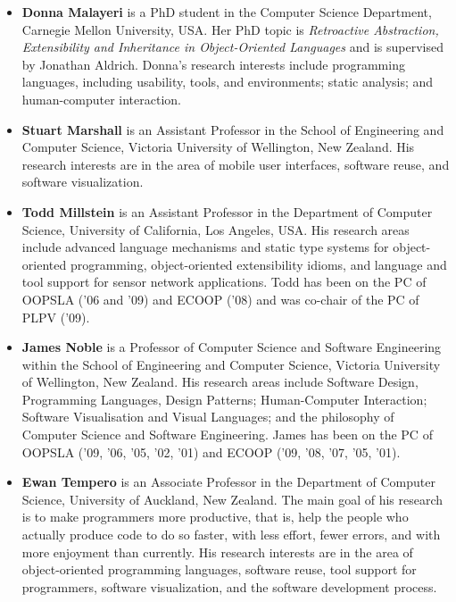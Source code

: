 \documentclass{acm_proc_article-sp}
\begin{document}
\begin{itemize}
\item \textbf{Donna Malayeri} is a PhD student in the Computer Science
  Department, Carnegie Mellon University, USA. Her PhD topic is
  \emph{Retroactive Abstraction, Extensibility and Inheritance in
    Object-Oriented Languages} and is supervised by Jonathan
  Aldrich. Donna's research interests include programming languages,
  including usability, tools, and environments; static analysis; and
  human-computer interaction.

\item \textbf{Stuart Marshall} is an Assistant Professor in the School
  of Engineering and Computer Science, Victoria University of
  Wellington, New Zealand. His research interests are in the area of
  mobile user interfaces, software reuse, and software visualization.

\item \textbf{Todd Millstein} is an Assistant Professor in the
  Department of Computer Science, University of California, Los
  Angeles, USA. His research areas include advanced language
  mechanisms and static type systems for object-oriented programming,
  object-oriented extensibility idioms, and language and tool support
  for sensor network applications. Todd has been on the PC of OOPSLA
  ('06 and '09) and ECOOP ('08) and was co-chair of the PC of PLPV
  ('09).

\item \textbf{James Noble} is a Professor of Computer Science and
  Software Engineering within the School of Engineering and Computer
  Science, Victoria University of Wellington, New Zealand.  His
  research areas include Software Design, Programming Languages,
  Design Patterns; Human-Computer Interaction; Software Visualisation
  and Visual Languages; and the philosophy of Computer Science and
  Software Engineering. James has been on the PC of OOPSLA ('09, '06,
  '05, '02, '01) and ECOOP ('09, '08, '07, '05, '01).


\item \textbf{Ewan Tempero} is an Associate Professor in the
  Department of Computer Science, University of Auckland, New
  Zealand. The main goal of his research is to make programmers more
  productive, that is, help the people who actually produce code to do
  so faster, with less effort, fewer errors, and with more enjoyment
  than currently. His research interests are in the area of
  object-oriented programming languages, software reuse, tool support
  for programmers, software visualization, and the software
  development process.

\end{itemize}
\end{document}
